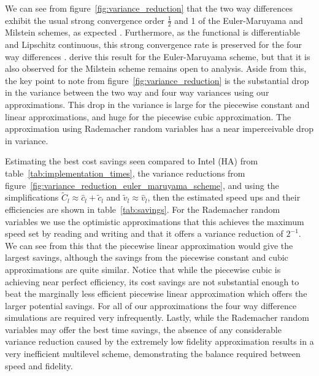 \documentclass[manuscript,review]{acmart}
\begin{document}
We can see from figure~\ref{fig:variance_reduction} that the two way differences exhibit the usual strong convergence order $ \tfrac{1}{2} $ and 1 of the Euler-Maruyama and Milstein schemes, as expected \citep{kloeden1999numerical}. Furthermore, as the functional is differentiable and Lipschitz continuous, this strong convergence rate is preserved for the four way differences \citep{giles2020approximate,sheridan2020nested}. \citeauthor{giles2020approximate} \citep{giles2020approximate,sheridan2020nested} derive this result for the Euler-Maruyama scheme, but that it is also observed for the Milstein scheme remains open to analysis. Aside from this, the key point to note from figure~\ref{fig:variance_reduction} is the substantial drop in the variance between the two way and four way variances using our approximations. This drop in the variance is large for the piecewise constant and linear approximations, and huge for the piecewise cubic approximation. The approximation using Rademacher random variables has a near imperceivable drop in variance. 

Estimating the best cost savings seen compared to Intel (HA) from table~\ref{tab:implementation_times}, the variance reductions from figure~\ref{fig:variance_reduction_euler_maruyama_scheme}, and using the simplifications $ \tilde{C}_l \approx \hat{c}_l + \tilde{c}_l $ and $ \tilde{v}_l \approx  \hat{v}_l $, then the estimated speed ups and their efficiencies are shown in table~\ref{tab:savings}. For the Rademacher random variables we use the optimistic  approximations that this achieves the maximum speed set by reading and writing and that it offers a variance reduction of $ 2^{-1} $. We can see from this that the piecewise linear approximation would give the largest savings, although the savings from the piecewise constant and cubic approximations are quite similar. Notice that while the piecewise cubic is achieving near perfect efficiency, its cost savings are not substantial enough to beat the marginally less efficient piecewise linear approximation which offers the larger potential savings. For all of our approximations the four way difference simulations are required very infrequently. Lastly, while the Rademacher random variables may offer the best time savings, the absence of any considerable variance reduction caused by the extremely low fidelity approximation results in a very inefficient multilevel scheme, demonstrating the balance required between speed and fidelity. 
\end{document}
